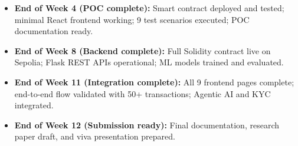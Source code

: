 \begin{itemize}
    \item \textbf{End of Week 4 (POC complete):} Smart contract deployed and tested; minimal React frontend working; 9 test scenarios executed; POC documentation ready.
    \item \textbf{End of Week 8 (Backend complete):} Full Solidity contract live on Sepolia; Flask REST APIs operational; ML models trained and evaluated.
    \item \textbf{End of Week 11 (Integration complete):} All 9 frontend pages complete; end-to-end flow validated with 50+ transactions; Agentic AI and KYC integrated.
    \item \textbf{End of Week 12 (Submission ready):} Final documentation, research paper draft, and viva presentation prepared.
\end{itemize}
